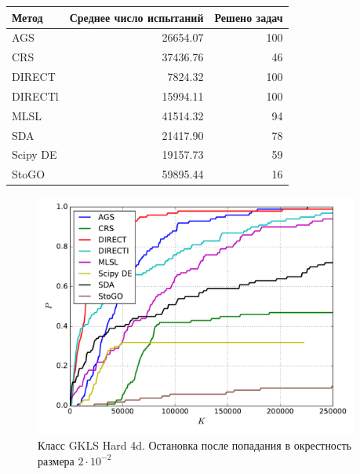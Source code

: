 \documentclass[a4paper]{article}
\begin{document}
\begin{tabular}{lrr}
\hline
 Метод    &   Среднее число испытаний &   Решено задач \\
\hline
 AGS      &                  26654.07 &            100 \\
 CRS      &                  37436.76 &             46 \\
 DIRECT   &                   7824.32 &            100 \\
 DIRECTl  &                  15994.11 &            100 \\
 MLSL     &                  41514.32 &             94 \\
 SDA      &                  21417.90 &             78 \\
 Scipy DE &                  19157.73 &             59 \\
 StoGO    &                  59895.44 &             16 \\
\hline
\end{tabular}
\begin{figure}[H]
  \center
  \includegraphics[width=0.95\textwidth]{../experiments/gklsh4d/cmc.pdf}
  \caption{Класс GKLS Hard 4d. Остановка после попадания в окрестность размера $2\cdot10^{-2}$}
  \label{fig:}
\end{figure}
\end{document}

